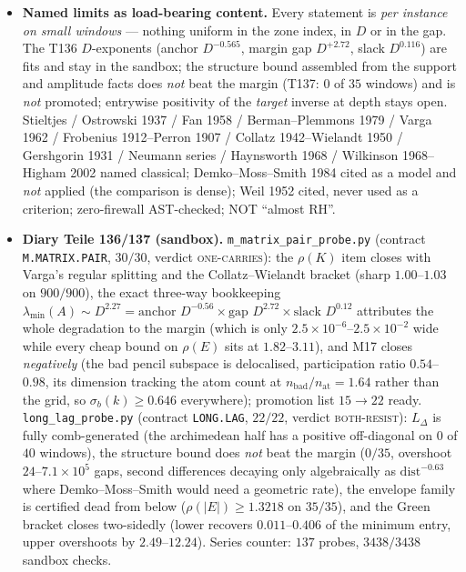 \documentclass[11pt]{article}
\begin{document}
\begin{itemize}[leftmargin=1.5em]
\item \textbf{Named limits as load-bearing content.} Every statement is \emph{per instance on small
windows} --- nothing uniform in the zone index, in $D$ or in the gap. The T136 $D$-exponents (anchor
$D^{-0.565}$, margin gap $D^{+2.72}$, slack $D^{0.116}$) are fits and stay in the sandbox; the
structure bound assembled from the support and amplitude facts does \emph{not} beat the margin (T137:
$0$ of $35$ windows) and is \emph{not} promoted; entrywise positivity of the \emph{target} inverse at
depth stays open. Stieltjes / Ostrowski 1937 / Fan 1958 / Berman--Plemmons 1979 / Varga 1962 /
Frobenius 1912--Perron 1907 / Collatz 1942--Wielandt 1950 / Gershgorin 1931 / Neumann series /
Haynsworth 1968 / Wilkinson 1968--Higham 2002 named classical; Demko--Moss--Smith 1984 cited as a
model and \emph{not} applied (the comparison is dense); Weil 1952 cited, never used as a criterion;
zero-firewall AST-checked; NOT ``almost RH''.
\item \textbf{Diary Teile 136/137 (sandbox).} \texttt{m\_matrix\_pair\_probe.py} (contract
\texttt{M.MATRIX.PAIR}, $30/30$, verdict \textsc{one-carries}): the $\rho(K)$ item closes with
Varga's regular splitting and the Collatz--Wielandt bracket (sharp $1.00$--$1.03$ on $900/900$), the
exact three-way bookkeeping $\lambda_{\min}(A)\sim D^{2.27}=\text{anchor }D^{-0.56}\times
\text{gap }D^{2.72}\times\text{slack }D^{0.12}$ attributes the whole degradation to the margin
(which is only $2.5\times10^{-6}$--$2.5\times10^{-2}$ wide while every cheap bound on $\rho(E)$
sits at $1.82$--$3.11$), and M17 closes \emph{negatively} (the bad pencil subspace is delocalised,
participation ratio $0.54$--$0.98$, its dimension tracking the atom count at
$n_{\mathrm{bad}}/n_{\mathrm{at}}=1.64$ rather than the grid, so $\sigma_b(k)\ge0.646$ everywhere);
promotion list $15\to22$ ready. \texttt{long\_lag\_probe.py} (contract \texttt{LONG.LAG}, $22/22$, verdict
\textsc{both-resist}): $L_\Delta$ is fully comb-generated (the archimedean half has a positive
off-diagonal on $0$ of $40$ windows), the structure bound does \emph{not} beat the margin ($0/35$,
overshoot $24$--$7.1\times10^{5}$ gaps, second differences decaying only algebraically as
$\mathrm{dist}^{-0.63}$ where Demko--Moss--Smith would need a geometric rate), the envelope family
is certified dead from below ($\rho(|E|)\ge1.3218$ on $35/35$), and the Green bracket closes
two-sidedly (lower recovers $0.011$--$0.406$ of the minimum entry, upper overshoots by
$2.49$--$12.24$). Series counter: $137$ probes, $3438/3438$ sandbox checks.

\end{itemize}
\end{document}
